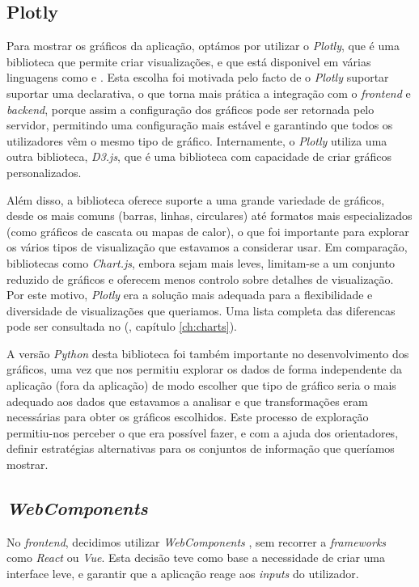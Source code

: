 \subsection{Plotly}

Para mostrar os gráficos da aplicação, optámos por utilizar o \textit{Plotly}, que é uma biblioteca  que permite criar visualizações, e que está disponivel em várias linguagens como  e . Esta escolha foi motivada pelo facto de o \textit{Plotly} suportar suportar uma  declarativa, o que torna mais prática a integração com o \textit{frontend} e \textit{backend}, porque assim a configuração dos gráficos pode ser retornada pelo servidor, permitindo uma configuração mais estável e garantindo que todos os utilizadores vêm o mesmo tipo de gráfico. Internamente, o \textit{Plotly} utiliza uma outra biblioteca, \textit{D3.js}, que é uma biblioteca com capacidade de criar gráficos personalizados.

Além disso, a biblioteca oferece suporte a uma grande variedade de gráficos, desde os mais comuns (barras, linhas, circulares) até formatos mais especializados (como gráficos de cascata ou mapas de calor), o que foi importante para explorar os vários tipos de visualização que estavamos a considerar usar. Em comparação, bibliotecas como \textit{Chart.js}, embora sejam mais leves, limitam-se a um conjunto reduzido de gráficos e oferecem menos controlo sobre detalhes de visualização. Por este motivo, \textit{Plotly} era a solução mais adequada para a flexibilidade e diversidade de visualizações que queriamos. Uma lista completa das diferencas pode ser consultada no (\cf, capítulo \ref{ch:charts}).

A versão \textit{Python} desta biblioteca foi também importante no desenvolvimento dos gráficos, uma vez que nos permitiu explorar os dados de forma independente da aplicação (fora da aplicação) de modo escolher que tipo de gráfico seria o mais adequado aos dados que estavamos a analisar e que transformações eram necessárias para obter os gráficos escolhidos. Este processo de exploração permitiu-nos perceber o que era possível fazer, e com a ajuda dos orientadores, definir estratégias alternativas para os conjuntos de informação que queríamos mostrar.

\subsection{\textit{WebComponents}}

No \textit{frontend}, decidimos utilizar \textit{WebComponents} \cite{webcomponents}, sem recorrer a \textit{frameworks} como \textit{React} ou \textit{Vue}. Esta decisão teve como base a necessidade de criar uma interface leve, e garantir que a aplicação reage aos \textit{inputs} do utilizador. 

